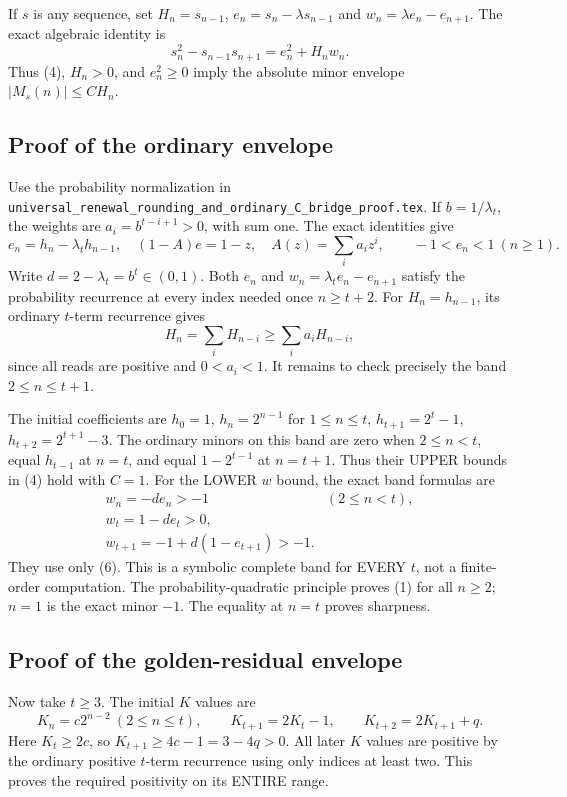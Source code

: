 If $s$ is any sequence, set $H_n=s_{n-1}$,
$e_n=s_n-\lambda s_{n-1}$ and $w_n=\lambda e_n-e_{n+1}$.
The exact algebraic identity is
\[
              s_n^2-s_{n-1}s_{n+1}=e_n^2+H_nw_n.       \tag{5}
\]
Thus (4), $H_n>0$, and $e_n^2\ge0$ imply the absolute minor
envelope $|M_s(n)|\le CH_n$.

\subsection{Proof of the ordinary envelope}
Use the probability normalization in
\texttt{universal\_renewal\_rounding\_and\_ordinary\_C\_bridge\_proof.tex}.
If $b=1/\lambda_t$, the weights are
$a_i=b^{t-i+1}>0$, with sum one. The exact identities give
\[
 e_n=h_n-\lambda_t h_{n-1},\quad
 (1-A)e=1-z,\quad A(z)=\sum_i a_i z^i,
 \qquad -1<e_n<1\ (n\ge1).                       \tag{6}
\]
Write $d=2-\lambda_t=b^t\in(0,1)$.
Both $e_n$ and $w_n=\lambda_te_n-e_{n+1}$ satisfy the probability
recurrence at every index needed once $n\ge t+2$.
For $H_n=h_{n-1}$, its ordinary $t$-term recurrence gives
\[
 H_n=\sum_i H_{n-i}\ge\sum_i a_iH_{n-i},
\]
since all reads are positive and $0<a_i<1$.
It remains to check precisely the band $2\le n\le t+1$.

The initial coefficients are $h_0=1$,
$h_n=2^{n-1}$ for $1\le n\le t$,
$h_{t+1}=2^t-1$, $h_{t+2}=2^{t+1}-3$.
The ordinary minors on this band are zero when $2\le n<t$,
equal $h_{t-1}$ at $n=t$, and equal $1-2^{t-1}$ at $n=t+1$.
Thus their UPPER bounds in (4) hold with $C=1$.
For the LOWER $w$ bound, the exact band formulas are
\[
\begin{array}{ll}
w_n=-d e_n>-1 &(2\le n<t),\\
w_t=1-d e_t>0,&\\
w_{t+1}=-1+d(1-e_{t+1})>-1.&
\end{array}
\]
They use only (6). This is a symbolic complete band for EVERY $t$,
not a finite-order computation. The probability-quadratic principle
proves (1) for all $n\ge2$; $n=1$ is the exact minor $-1$.
The equality at $n=t$ proves sharpness.

\subsection{Proof of the golden-residual envelope}
Now take $t\ge3$. The initial $K$ values are
\[
 K_n=c2^{n-2}\ (2\le n\le t),\qquad
 K_{t+1}=2K_t-1,\qquad K_{t+2}=2K_{t+1}+q.
\]
Here $K_t\ge2c$, so $K_{t+1}\ge4c-1=3-4q>0$.
All later $K$ values are positive by the ordinary positive
$t$-term recurrence using only indices at least two. This proves
the required positivity on its ENTIRE range.

